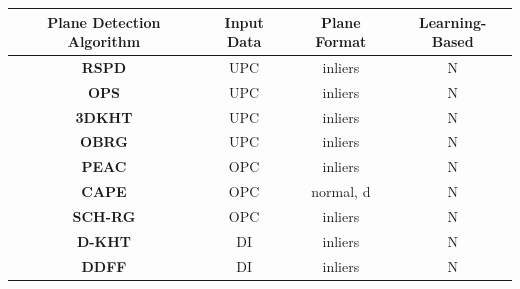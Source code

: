\documentclass[main.tex]{subfiles}
\begin{document}
\begin{table}[H]
    \centering
    \begin{tabular}{c|c|c|c}
        \textbf{Plane Detection Algorithm}                               & \textbf{Input Data} & \textbf{Plane Format} & \textbf{Learning-Based} \\ \hline%
        \textbf{RSPD} \cite{Araújo_Oliveira_2020}                        & UPC                 & inliers               & N                       \\ %
        \textbf{OPS} \cite{Sun_Mordohai_2019}                            & UPC                 & inliers               & N                       \\ %
        \textbf{3DKHT} \cite{Limberger_Oliveira_2015}                    & UPC                 & inliers               & N                       \\ %
        \textbf{OBRG} \cite{Vo_Truong-Hong_Laefer_Bertolotto_2015}       & UPC                 & inliers               & N                       \\ %
        \textbf{PEAC} \cite{Feng_Taguchi_Kamat_2014}                     & OPC                 & inliers               & N                       \\ %
        \textbf{CAPE} \cite{Proença_Gao_2018}                            & OPC                 & normal, d             & N                       \\ %
        \textbf{SCH-RG} \cite{Mols_Li_Hanebeck_2020}                     & OPC                 & inliers              & N                       \\ %
        \textbf{D-KHT}  \cite{Vera_Lucio_Fernandes_Velho_2018}           & DI                  & inliers               & N                       \\ %
        \textbf{DDFF} \cite{Roychoudhury_Missura_Bennewitz_2021}         & DI                  & inliers               & N                       \\ %

\end{tabular}
\end{table}
\end{document}
